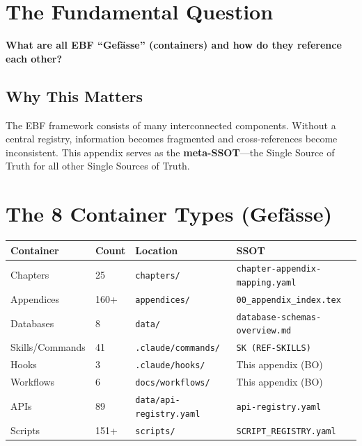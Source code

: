 \section{The Fundamental Question}
\label{sec:bo-fundamental}

\begin{tcolorbox}[colback=red!5!white, colframe=red!75!black,
    title=The Fundamental Question]
\textbf{What are all EBF ``Gefässe'' (containers) and how do they reference each other?}
\end{tcolorbox}

\subsection{Why This Matters}

The EBF framework consists of many interconnected components. Without a central
registry, information becomes fragmented and cross-references become inconsistent.
This appendix serves as the \textbf{meta-SSOT}---the Single Source of Truth for
all other Single Sources of Truth.


\section{The 8 Container Types (Gefässe)}
\label{sec:bo-containers}

\begin{tcolorbox}[colback=green!5!white, colframe=green!75!black,
    title=EBF Container Types Overview]

\begin{center}
\begin{tabular}{|l|l|l|l|}
\hline
\textbf{Container} & \textbf{Count} & \textbf{Location} & \textbf{SSOT} \\
\hline
Chapters & 25 & \texttt{chapters/} & \texttt{chapter-appendix-mapping.yaml} \\
Appendices & 160+ & \texttt{appendices/} & \texttt{00\_appendix\_index.tex} \\
Databases & 8 & \texttt{data/} & \texttt{database-schemas-overview.md} \\
Skills/Commands & 41 & \texttt{.claude/commands/} & \texttt{SK (REF-SKILLS)} \\
Hooks & 3 & \texttt{.claude/hooks/} & This appendix (BO) \\
Workflows & 6 & \texttt{docs/workflows/} & This appendix (BO) \\
APIs & 89 & \texttt{data/api-registry.yaml} & \texttt{api-registry.yaml} \\
Scripts & 151+ & \texttt{scripts/} & \texttt{SCRIPT\_REGISTRY.yaml} \\
\hline
\end{tabular}
\end{center}

\end{tcolorbox}


